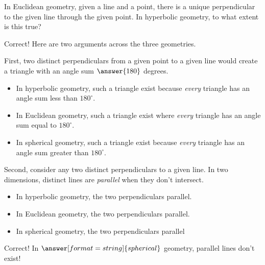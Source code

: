 \documentclass{ximera}
\begin{document}

\begin{problem}
In Euclidean geometry, given a line and a point, there is a unique perpendicular to the given line through the given point.  In hyperbolic geometry, to what extent is this true? 
\begin{multipleChoice}
\end{multipleChoice}
\begin{problem}
Correct!  Here are two arguments across the three geometries. 

First, two distinct perpendiculars from a given point to a given line would create a triangle with an angle sum 
 $\answer{180}$ degrees.  
\begin{itemize}
\item In hyperbolic geometry, such a triangle  exist because \emph{every} triangle has an angle sum less than $180^\circ$.  
\item In Euclidean geometry, such a triangle  exist where \emph{every} triangle has an angle sum equal to $180^\circ$.  
\item In spherical geometry, such a triangle  exist because \emph{every} triangle has an angle sum greater than $180^\circ$.  
\end{itemize}

\begin{problem}
Second, consider any two distinct perpendiculars to a given line.  In two dimensions, distinct lines are \emph{parallel} when they don't intersect.
\begin{itemize}
\item In hyperbolic geometry, the two perpendiculars  parallel.    
\item In Euclidean geometry, the two perpendiculars  parallel.  
\item In spherical geometry, the two perpendiculars  parallel 
\end{itemize}
\begin{problem}
Correct!  In $\answer[format=string]{spherical}$ geometry, parallel lines don't exist!   


\end{problem}
\end{problem}
\end{problem}
\end{problem}
\end{document}
